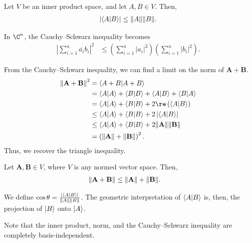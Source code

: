 \documentclass[10pt]{mypackage}
\begin{document}
\begin{definition}
Let $V$ be an inner product space, and let $A,B\in V$. Then,
\begin{align*}
  \left\vert \braket{A}{B} \right\vert\leq \norm{A}\norm{B}.
\end{align*}
\end{definition}
\begin{example}
  In $\C^n$, the Cauchy--Schwarz inequality becomes
  \begin{align*}
    \left\vert \sum_{i=1}^{n}\overline{a_i}b_i \right\vert^2 &\leq \left(\sum_{i=1}^{n}\left\vert a_i \right\vert^2\right)\left(\sum_{i=1}^{n}\left\vert b_i \right\vert^2\right).
  \end{align*}
  
\end{example}
From the Cauchy--Schwarz inequality, we can find a limit on the norm of $\mathbf{A} + \mathbf{B}$.
\begin{align*}
  \norm{\mathbf{A} + \mathbf{B}}^2 &= \braket{A+B}{A+B}\\
                                   &= \braket{A}{A} + \braket{B}{B} + \braket{A}{B} + \braket{B}{A}\\
                                   &= \braket{A}{A} + \braket{B}{B} + 2\re\left(\braket{A}{B}\right)\\
                                   &\leq \braket{A}{A} + \braket{B}{B} + 2\left\vert \braket{A}{B} \right\vert\\
                                   &\leq \braket{A}{A} + \braket{B}{B} + 2\norm{\mathbf{A}}\norm{\mathbf{B}}\\
                                   &= \left(\norm{\mathbf{A}} + \norm{\mathbf{B}}\right)^2.
\end{align*}
Thus, we recover the triangle inequality.
\begin{definition}
  Let $\mathbf{A},\mathbf{B}\in V$, where $V$ is any normed vector space. Then,
  \begin{align*}
    \norm{\mathbf{A} + \mathbf{B}} &\leq \norm{\mathbf{A}} + \norm{\mathbf{B}}.
  \end{align*}
\end{definition}
We define $\cos\theta = \frac{\left\vert \braket{A}{B} \right\vert}{\norm{A}\norm{B}}$. The geometric interpretation of $\braket{A}{B}$ is, then, the projection of $\ket{B}$ onto $\ket{A}$.\newline

Note that the inner product, norm, and the Cauchy--Schwarz inequality are completely basis-independent.
\end{document}
